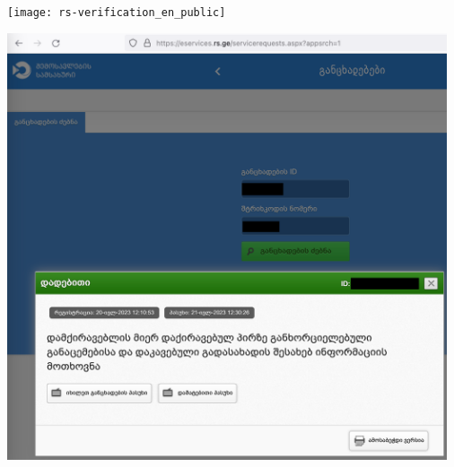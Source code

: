 \begin{center}
    \texttt{[image: rs-verification\_en\_public]}
\end{center}

\begin{center}
    \includegraphics[width=35em]{rs-verification_public}
\end{center}

\pagebreak
